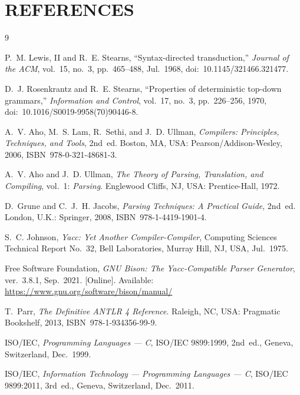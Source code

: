 \documentclass[12pt,a4paper,oneside,openany]{report}
\begin{document}
\chapter{REFERENCES}
\label{page:references}
\begin{thebibliography}{9}
\setlength{\itemsep}{6pt}

P.~M. Lewis, II and R.~E. Stearns, ``Syntax-directed transduction,''
\emph{Journal of the ACM}, vol.~15, no.~3, pp.~465--488, Jul.~1968,
doi:~10.1145/321466.321477.

D.~J. Rosenkrantz and R.~E. Stearns, ``Properties of deterministic
top-down grammars,'' \emph{Information and Control}, vol.~17, no.~3,
pp.~226--256, 1970, doi:~10.1016/S0019-9958(70)90446-8.

A.~V. Aho, M.~S. Lam, R.~Sethi, and J.~D. Ullman, \emph{Compilers:
Principles, Techniques, and Tools}, 2nd~ed. Boston, MA, USA:
Pearson/Addison-Wesley, 2006, ISBN~978-0-321-48681-3.

A.~V. Aho and J.~D. Ullman, \emph{The Theory of Parsing, Translation, and
Compiling}, vol.~1: \emph{Parsing}. Englewood Cliffs, NJ, USA:
Prentice-Hall, 1972.

D.~Grune and C.~J.~H. Jacobs, \emph{Parsing Techniques: A Practical
Guide}, 2nd~ed. London, U.K.: Springer, 2008, ISBN~978-1-4419-1901-4.

S.~C. Johnson, \emph{Yacc: Yet Another Compiler-Compiler}, Computing
Sciences Technical Report No.~32, Bell Laboratories, Murray Hill, NJ,
USA, Jul.~1975.

Free Software Foundation, \emph{GNU Bison: The Yacc-Compatible Parser
Generator}, ver.~3.8.1, Sep.~2021. [Online]. Available:
\url{https://www.gnu.org/software/bison/manual/}

T.~Parr, \emph{The Definitive ANTLR 4 Reference}. Raleigh, NC, USA:
Pragmatic Bookshelf, 2013, ISBN~978-1-934356-99-9.

ISO/IEC, \emph{Programming Languages --- C}, ISO/IEC 9899:1999, 2nd~ed.,
Geneva, Switzerland, Dec.~1999.

ISO/IEC, \emph{Information Technology --- Programming Languages --- C},
ISO/IEC 9899:2011, 3rd~ed., Geneva, Switzerland, Dec.~2011.

\end{thebibliography}
\end{document}
